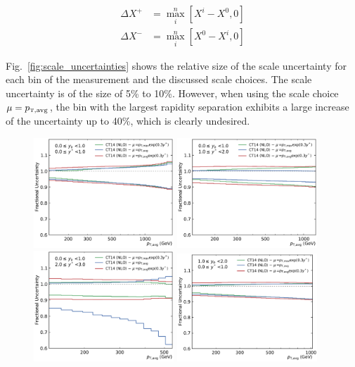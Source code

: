 \begin{align*}
    \Delta X^+ &= \max_{i}^{n} \left[ X^i - X^0, 0 \right]\\
    \Delta X^- &= \max_{i}^{n} \left[ X^0 - X^i, 0 \right]
\end{align*}


Fig.~\ref{fig:scale_uncertainties} shows the relative size of the scale
uncertainty for each bin of the measurement and the discussed scale choices. The
scale uncertainty is of the size of 5\% to 10\%. However, when using the scale
choice $\mu=\ptavg$, the bin with the largest rapidity separation exhibits a large
increase of the uncertainty up to 40\%, which is clearly undesired.

\begin{figure}[htp]
    \centering
    \includegraphics[width=0.47\textwidth]{figures/theory/scale_uncert_comp_yb0ys0.pdf}\hfill
    \includegraphics[width=0.47\textwidth]{figures/theory/scale_uncert_comp_yb0ys1.pdf}
    \includegraphics[width=0.47\textwidth]{figures/theory/scale_uncert_comp_yb0ys2.pdf}\hfill
    \includegraphics[width=0.47\textwidth]{figures/theory/scale_uncert_comp_yb1ys0.pdf}

\end{figure}
